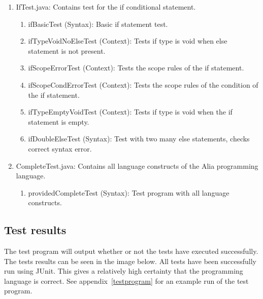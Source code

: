 \documentclass[paper=a4, fontsize=11pt]{article}
\numberwithin{equation}{section}		%
\numberwithin{figure}{section}			%
\numberwithin{table}{section}				%
\begin{document}
\begin{enumerate}
\item IfTest.java: Contains test for the if conditional statement.
  \begin{enumerate}
  \item ifBasicTest (Syntax): Basic if statement test.
  \item ifTypeVoidNoElseTest (Context): Tests if type is void when else statement is not present.
  \item ifScopeErrorTest (Context): Tests the scope rules of the if statement.
  \item ifScopeCondErrorTest (Context): Tests the scope rules of the condition of the if statement.
  \item ifTypeEmptyVoidTest (Context): Tests if type is void when the if statement is empty.
  \item ifDoubleElseTest (Syntax): Test with two many else statements, checks correct syntax error.
  \end{enumerate}
\item CompleteTest.java: Contains all language constructs of the Alia programming language.
  \begin{enumerate}
  \item providedCompleteTest (Syntax): Test program with all language constructs.
  \end{enumerate}
\end{enumerate}

\subsection{Test results}
The test program will output whether or not the tests have executed successfully. The tests results can be seen in the image below. All tests have been successfully run using JUnit. This gives a relatively high certainty that the programming language is correct. See appendix~\ref{testprogram} for an example run of the test program.
\end{document}
